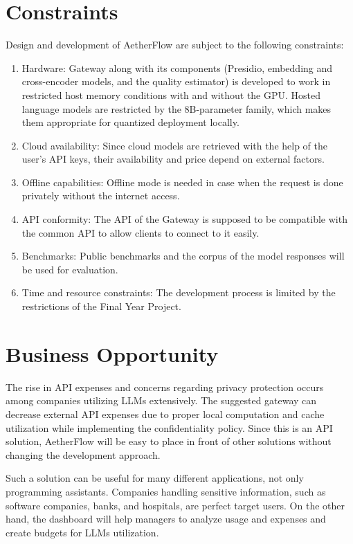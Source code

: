 \documentclass{FastFyp}
\begin{document}
\section{Constraints}
\label{sec:constraints}

Design and development of AetherFlow are subject to the following constraints:

\begin{enumerate}
    \item Hardware: Gateway along with its components (Presidio, embedding and cross-encoder models, and the quality estimator) is developed to work in restricted host memory conditions with and without the GPU. Hosted language models are restricted by the 8B-parameter family, which makes them appropriate for quantized deployment locally.
    \item Cloud availability: Since cloud models are retrieved with the help of the user's API keys, their availability and price depend on external factors.
    \item Offline capabilities: Offline mode is needed in case when the request is done privately without the internet access.
    \item API conformity: The API of the Gateway is supposed to be compatible with the common API to allow clients to connect to it easily.
    \item Benchmarks: Public benchmarks and the corpus of the model responses will be used for evaluation.
    \item Time and resource constraints: The development process is limited by the restrictions of the Final Year Project.
\end{enumerate}

\section{Business Opportunity}
\label{sec:business}

The rise in API expenses and concerns regarding privacy protection occurs among companies utilizing LLMs extensively. The suggested gateway can decrease external API expenses due to proper local computation and cache utilization while implementing the confidentiality policy. Since this is an API solution, AetherFlow will be easy to place in front of other solutions without changing the development approach.

Such a solution can be useful for many different applications, not only programming assistants. Companies handling sensitive information, such as software companies, banks, and hospitals, are perfect target users. On the other hand, the dashboard will help managers to analyze usage and expenses and create budgets for LLMs utilization.
\end{document}
